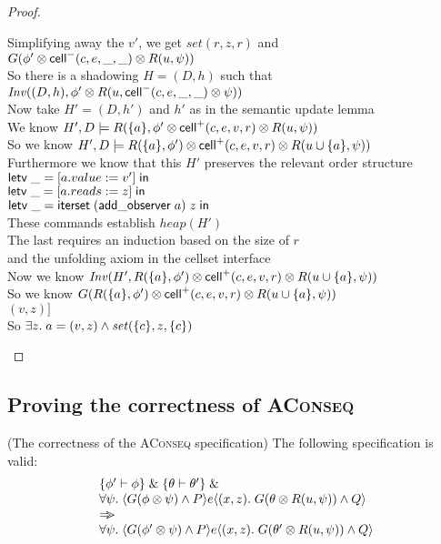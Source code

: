 \begin{proof}
\begin{tabbedproof}
\ooo Simplifying away the $v'$, we get $\mathit{set}(r, z, r)$ and $G(\phi' \otimes \mathsf{cell}^{-}({c}, {e}, {\_}, {\_}) \otimes R(u, \psi))$ \\
\ooo So there is a shadowing $H = (D,h)$ such that $\mathit{Inv}((D, h), \phi' \otimes R(u, \mathsf{cell}^{-}({c}, {e}, {\_}, {\_}) \otimes \psi))$ \\
\ooo Now take $H' = (D,h')$ and $h'$ as in the semantic update lemma \\
\ooo We know $H', D \models R(\{{a}\}, \phi' \otimes \mathsf{cell}^{+}({c}, {e}, {v}, {r}) \otimes R(u, \psi))$\\
\ooo So we know $H', D \models R(\{{a}\}, \phi') \otimes \mathsf{cell}^{+}({c}, {e}, {v}, {r}) \otimes R(u \cup \{{a}\}, \psi))$ \\
\ooo Furthermore we know that this $H'$ preserves the relevant order structure \\
\ooo $\mathsf{letv}\;\_ = [a.value := v']\;\mathsf{in}\;$ \\
\ooo $\mathsf{letv}\;\_ = [a.reads := z]\;\mathsf{in}\;$ \\
\ooo $\mathsf{letv}\;\_ = \mathsf{iterset}\;(\mathsf{add\_observer}\;a)\;z\;\mathsf{in}\;$ \\
\ooo These commands establish $\mathit{heap}(H')$ \\
\ooo The last requires an induction based on the size of $r$ \\ 
\oox and the unfolding axiom in the cellset interface \\
\ooo Now we know $\mathit{Inv}(H', R(\{{a}\}, \phi') \otimes \mathsf{cell}^{+}({c}, {e}, {v}, {r}) \otimes R(u \cup \{{a}\}, \psi))$ \\
\ooo So we know $G(R(\{{a}\}, \phi') \otimes \mathsf{cell}^{+}({c}, {e}, {v}, {r}) \otimes R(u \cup \{{a}\}, \psi))$ \\
\ooo $(v, z)]$ \\
\ooo So $\exists z.\;a = (v,z) \land \mathit{set}(\{{c}\}, z, \{{c}\})$ 
\end{tabbedproof}
\end{proof}

\subsection{Proving the correctness of \textsc{AConseq}}

\begin{prop*}{(The correctness of the \textsc{AConseq} specification)}
The following specification is valid:
\begin{displaymath}
\begin{array}{l}
\{{\phi' \vdash \phi}\} \;\&\; \{{\theta \vdash \theta'}\} \;\&\; \\
\forall \psi.\; \langle{G(\phi \otimes \psi) \land P}\rangle{e}\langle{(x,z)}.\;{G(\theta\otimes R(u, \psi)) \land Q}\rangle \\
\Rightarrow\!\!\!> \\
\forall \psi.\; \langle{G(\phi' \otimes \psi) \land P}\rangle{e}\langle{(x,z)}.\;{G(\theta'\otimes R(u, \psi)) \land Q}\rangle  \\
\end{array}
\end{displaymath}
\end{prop*}

